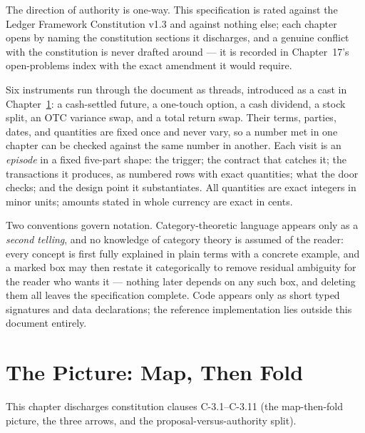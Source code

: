 \documentclass[11pt,a4paper]{article}
\begin{document}
The direction of authority is one-way. This specification is rated against the Ledger
Framework Constitution v1.3 and against nothing else; each chapter opens by naming the
constitution sections it discharges, and a genuine conflict with the constitution is
never drafted around --- it is recorded in Chapter~17's open-problems index with the
exact amendment it would require.

Six instruments run through the document as threads, introduced as a cast in
Chapter~\ref{ch:picture}: a cash-settled future, a one-touch option, a cash dividend,
a stock split, an OTC variance swap, and a total return swap. Their terms, parties,
dates, and quantities are fixed once and never vary, so a number met in one chapter
can be checked against the same number in another. Each visit is an \emph{episode} in
a fixed five-part shape: the trigger; the contract that catches it; the transactions
it produces, as numbered rows with exact quantities; what the door checks; and the
design point it substantiates. All quantities are exact integers in minor units;
amounts stated in whole currency are exact in cents.

Two conventions govern notation. Category-theoretic language appears only as a
\emph{second telling}, and no knowledge of category theory is assumed of the reader:
every concept is first fully explained in plain terms with a concrete example, and a
marked box may then restate it categorically to remove residual ambiguity for the reader
who wants it --- nothing later depends on any such box, and deleting them all
leaves the specification complete. Code appears only as short typed signatures and
data declarations; the reference implementation lies outside this document entirely.

\section{The Picture: Map, Then Fold}\label{ch:picture}

This chapter discharges constitution clauses C-3.1--C-3.11 (the map-then-fold picture, the three arrows, and the proposal-versus-authority split).
\end{document}
